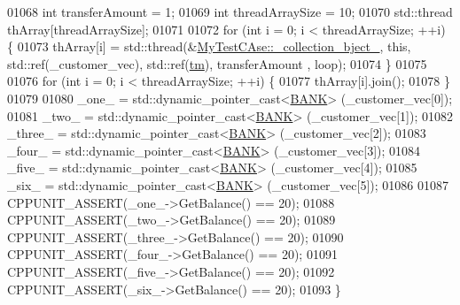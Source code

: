 \begin{DoxyCode}
01068     \textcolor{keywordtype}{int} transferAmount = 1;
01069     \textcolor{keywordtype}{int} threadArraySize = 10; 
01070     std::thread thArray[threadArraySize];
01071 
01072     \textcolor{keywordflow}{for} (\textcolor{keywordtype}{int} i = 0; i < threadArraySize; ++i) \{ 
01073         thArray[i] = std::thread(&\hyperlink{class_my_test_c_ase_a9ec1ddfc6e7f727446e1a8355086c2dd_a9ec1ddfc6e7f727446e1a8355086c2dd}{MyTestCAse::\_collection\_bject\_}, \textcolor{keyword}{this}, 
      std::ref(\_customer\_vec),  std::ref(\hyperlink{class_my_test_c_ase_a422e6e5d4ddedea384be96031c89b72b_a422e6e5d4ddedea384be96031c89b72b}{tm}), transferAmount , loop);
01074     \}
01075     
01076     \textcolor{keywordflow}{for} (\textcolor{keywordtype}{int} i = 0; i < threadArraySize; ++i) \{
01077         thArray[i].join();
01078     \}
01079     
01080     \_one\_ = std::dynamic\_pointer\_cast<\hyperlink{class_b_a_n_k}{BANK}> (\_customer\_vec[0]);
01081     \_two\_ = std::dynamic\_pointer\_cast<\hyperlink{class_b_a_n_k}{BANK}> (\_customer\_vec[1]);
01082     \_three\_ = std::dynamic\_pointer\_cast<\hyperlink{class_b_a_n_k}{BANK}> (\_customer\_vec[2]);
01083     \_four\_ = std::dynamic\_pointer\_cast<\hyperlink{class_b_a_n_k}{BANK}> (\_customer\_vec[3]);
01084     \_five\_ = std::dynamic\_pointer\_cast<\hyperlink{class_b_a_n_k}{BANK}> (\_customer\_vec[4]);
01085     \_six\_ = std::dynamic\_pointer\_cast<\hyperlink{class_b_a_n_k}{BANK}> (\_customer\_vec[5]);
01086  
01087     CPPUNIT\_ASSERT(\_one\_->GetBalance() == 20);
01088     CPPUNIT\_ASSERT(\_two\_->GetBalance() == 20);
01089     CPPUNIT\_ASSERT(\_three\_->GetBalance() == 20);
01090     CPPUNIT\_ASSERT(\_four\_->GetBalance() == 20);
01091     CPPUNIT\_ASSERT(\_five\_->GetBalance() == 20);
01092     CPPUNIT\_ASSERT(\_six\_->GetBalance() == 20);
01093 \}
\end{DoxyCode}
